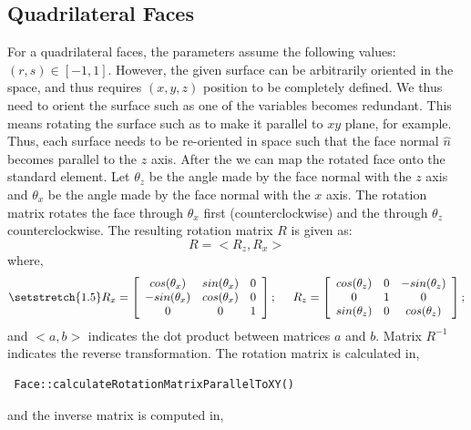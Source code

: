 \subsection{Quadrilateral Faces}
For a quadrilateral faces, the parameters assume the following values: $(r,s) \in [-1,1]$.
However, the given surface can be arbitrarily oriented in the space, and thus requires $(x,y,z)$ position
to be completely defined. 
We thus need to orient the surface such as one of the variables becomes redundant. This means rotating 
the surface such as to make it parallel to $xy$ plane, for example. 
Thus, each surface needs to be re-oriented in space such that the face normal $\hat{n}$ becomes
parallel to the $z$ axis. After the we can map the rotated face onto the standard element. 
Let $\theta_z$ be the angle made by the face normal with the $z$ axis and $\theta_x$ be the angle made by
the face normal with the $x$ axis. 
The rotation matrix rotates the face through $\theta_x$ first (counterclockwise) and the through $\theta_z$
counterclockwise. The resulting rotation matrix $R$ is given as:
\begin{equation}\label{rotMat1}
	R = <R_z, R_x>
\end{equation}
where,
\begin{equation}\label{rotMat}
	{\setstretch{1.5}
	R_x = 
	 \left[\begin{array}{c c c}
				cos(\theta_x) & sin(\theta_x)  & 0  \\
			       -sin(\theta_x) & cos(\theta_x)  & 0  \\
				       0      &       0        & 1  \\
         \end{array} \right];
\hspace{5mm}
	R_z = 
	 \left[\begin{array}{c c c}
				cos(\theta_z)   & 0 & -sin(\theta_z) \\
				       0        & 1 &       0       \\
			        sin(\theta_z)   & 0 & cos(\theta_z) \\
         \end{array} \right];
 }
 \end{equation}
 and $<a,b>$ indicates the dot product between matrices $a$ and $b$. 
 Matrix $R^{-1}$ indicates the reverse transformation.
 The rotation matrix is calculated in,
 \begin{verbatim}
 Face::calculateRotationMatrixParallelToXY()
 \end{verbatim}
 and the inverse matrix is computed in,
